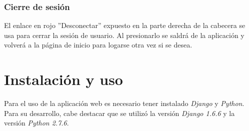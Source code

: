 \documentclass[a4paper, 12pt]{book}
\begin{document}
\subsection{Cierre de sesi\'on}
El enlace en rojo ''Desconectar'' expuesto en la parte derecha de la cabecera se usa para cerrar la sesi\'on de usuario. Al presionarlo se saldr\'a de la 
aplicaci\'on y volver\'a a la p\'agina de inicio para logarse otra vez si se desea.
\cleardoublepage
\chapter{Instalaci\'on y uso}
\label{app:instalacionuso}

Para el uso de la aplicaci\'on web es necesario tener instalado \textit{Django} y \textit{Python}. Para su desarrollo, cabe destacar que se utiliz\'o la 
versi\'on \textit{Django 1.6.6} y la versi\'on \textit{Python 2.7.6}.


\cleardoublepage


\end{document}
